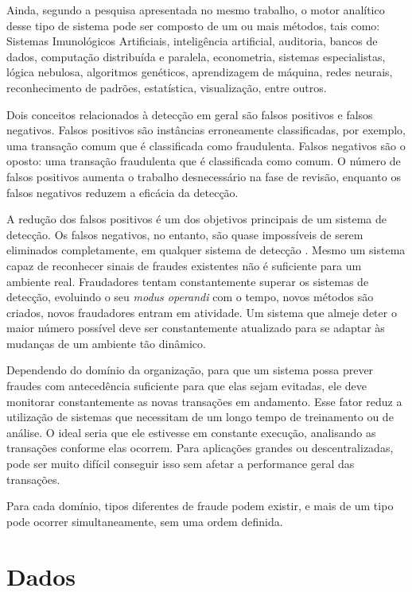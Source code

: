 Ainda, segundo a pesquisa apresentada no mesmo trabalho, o motor analítico desse tipo de sistema pode ser composto de um ou mais métodos, tais como: Sistemas Imunológicos Artificiais, inteligência artificial, auditoria, bancos de dados, computação distribuída e paralela, econometria, sistemas especialistas, lógica nebulosa, algoritmos genéticos, aprendizagem de máquina, redes neurais, reconhecimento de padrões, estatística, visualização, entre outros.

Dois conceitos relacionados à detecção em geral são falsos positivos e falsos negativos. Falsos positivos são instâncias erroneamente classificadas, por exemplo, uma transação comum que é classificada como fraudulenta. Falsos negativos são o oposto: uma transação fraudulenta que é classificada como comum. O número de falsos positivos aumenta o trabalho desnecessário na fase de revisão, enquanto os falsos negativos reduzem a eficácia da detecção.

A redução dos falsos positivos é um dos objetivos principais de um sistema de detecção. Os falsos negativos, no entanto, são quase impossíveis de serem eliminados completamente, em qualquer sistema de detecção \cite{Michie1994}. Mesmo um sistema capaz de reconhecer sinais de fraudes existentes não é suficiente para um ambiente real. Fraudadores tentam constantemente superar os sistemas de detecção, evoluindo o seu \emph{modus operandi} com o tempo, novos métodos são criados, novos fraudadores entram em atividade. Um sistema que almeje deter o maior número possível deve ser constantemente atualizado para se adaptar às mudanças de um ambiente tão dinâmico.

Dependendo do domínio da organização, para que um sistema possa prever fraudes com antecedência suficiente para que elas sejam evitadas, ele deve monitorar constantemente as novas transações em andamento. Esse fator reduz a utilização de sistemas que necessitam de um longo tempo de treinamento ou de análise. O ideal seria que ele estivesse em constante execução, analisando as transações conforme elas ocorrem. Para aplicações grandes ou descentralizadas, pode ser muito difícil conseguir isso sem afetar a performance geral das transações.

Para cada domínio, tipos diferentes de fraude podem existir, e mais de um tipo pode ocorrer simultaneamente, sem uma ordem definida. 

\section{Dados}
\label{fraud:data}

